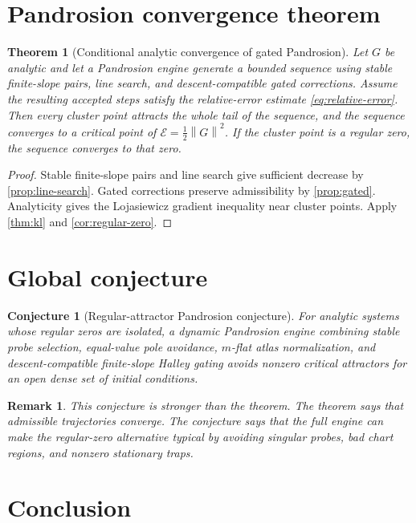 \documentclass[11pt]{article}
\newtheorem{theorem}[definition]{Theorem}
\newtheorem{conjecture}[definition]{Conjecture}
\newtheorem{remark}[definition]{Remark}
\newcommand{\E}{\mathcal E}
\newcommand{\norm}[1]{\left\lVert #1\right\rVert}
\begin{document}
\section{Pandrosion convergence theorem}

\begin{theorem}[Conditional analytic convergence of gated Pandrosion]\label{thm:pand-convergence}
Let \(G\) be analytic and let a Pandrosion engine generate a bounded sequence using stable finite-slope pairs, line search, and descent-compatible gated corrections. Assume the resulting accepted steps satisfy the relative-error estimate \eqref{eq:relative-error}. Then every cluster point attracts the whole tail of the sequence, and the sequence converges to a critical point of \(\E=\frac12\norm{G}^2\). If the cluster point is a regular zero, the sequence converges to that zero.
\end{theorem}

\begin{proof}
Stable finite-slope pairs and line search give sufficient decrease by \cref{prop:line-search}. Gated corrections preserve admissibility by \cref{prop:gated}. Analyticity gives the Lojasiewicz gradient inequality near cluster points. Apply \cref{thm:kl} and \cref{cor:regular-zero}.
\end{proof}

\section{Global conjecture}

\begin{conjecture}[Regular-attractor Pandrosion conjecture]
For analytic systems whose regular zeros are isolated, a dynamic Pandrosion engine combining stable probe selection, equal-value pole avoidance, \(m\)-flat atlas normalization, and descent-compatible finite-slope Halley gating avoids nonzero critical attractors for an open dense set of initial conditions.
\end{conjecture}

\begin{remark}
This conjecture is stronger than the theorem. The theorem says that admissible trajectories converge. The conjecture says that the full engine can make the regular-zero alternative typical by avoiding singular probes, bad chart regions, and nonzero stationary traps.
\end{remark}

\section{Conclusion}
\end{document}
